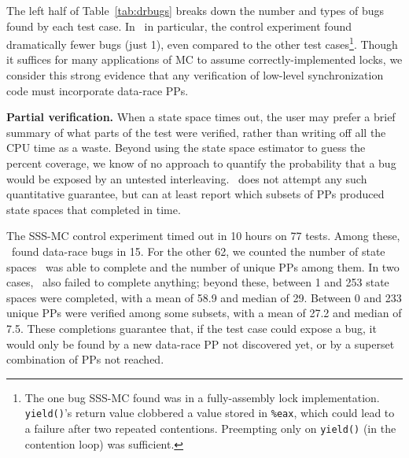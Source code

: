 The left half of Table~\ref{tab:drbugs} breaks down the number and types of bugs found by each test case.
In \mxtest~in particular, the control experiment found dramatically fewer bugs (just 1),
even compared to the other test cases\footnote{
	The one bug SSS-MC found was in a fully-assembly lock implementation. {\tt yield()}'s return value clobbered a value stored in {\tt \%eax}, which could lead to a failure after two repeated contentions. Preempting only on {\tt yield()} (in the contention loop) was sufficient.}.
Though it suffices for many applications of MC to assume correctly-implemented locks,
we consider this strong evidence that any verification of low-level synchronization code must incorporate data-race PPs.

{\bf Partial verification.}
When a state space times out, the user may prefer a brief summary of what parts of the test were verified, rather than writing off all the CPU time as a waste.
Beyond using the state space estimator to guess the percent coverage,
we know of no approach to quantify the probability
that a bug would be exposed by an untested interleaving.
\quicksand~does not attempt any such quantitative guarantee,
but can at least report which subsets of PPs produced state spaces that completed in time.

The SSS-MC control experiment timed out in 10 hours on 77 tests.
Among these, \quicksand~found data-race bugs in 15.
For the other 62, we counted the number of state spaces \quicksand~was able to complete and the number of unique PPs among them.
In two cases, \quicksand~also failed to complete anything; beyond these,
between 1 and 253 state spaces were completed, with a mean of 58.9 and median of 29.
Between 0 and 233 unique PPs were verified among some subsets, with a mean of 27.2 and median of 7.5.
These completions guarantee that, if the test case could expose a bug,
it would only be found by a new data-race PP not discovered yet, or by a superset combination of PPs not reached.

